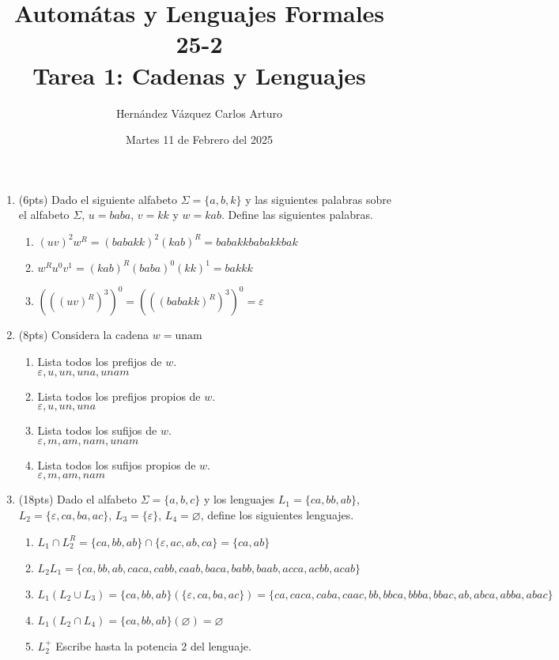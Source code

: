 \documentclass{article}
\title{Autom\'atas y Lenguajes Formales 25-2 \\ Tarea 1: Cadenas y Lenguajes}
\author{Hernández Vázquez Carlos Arturo }
\date{Martes 11 de Febrero del 2025}
\begin{document}
\maketitle

\begin{enumerate}
    \item (6pts) Dado el siguiente alfabeto $\Sigma = \{a, b, k\}$ y las siguientes palabras sobre el alfabeto $\Sigma$, $u = baba$, $v = kk$ y $w = kab$. Define las siguientes palabras.
    \begin{enumerate}
        \item $(uv)^2w^R = (babakk)^2(kab)^R = babakkbabakkbak$
        \item $w^R u^0 v^1 = (kab)^R(baba)^0(kk)^1 = bakkk$ 
        \item $(((uv)^R)^3)^0 = (((babakk)^R)^3)^0 = \varepsilon$ 
    \end{enumerate}
    \item (8pts) Considera la cadena $w = \text{unam}$
    \begin{enumerate}
        \item Lista todos los prefijos de $w$. \\
        $\varepsilon, u, un, una, unam$
        \item Lista todos los prefijos propios de $w$. \\
        $\varepsilon, u, un, una$
        \item Lista todos los sufijos de $w$. \\
        $\varepsilon, m, am, nam, unam$
        \item Lista todos los sufijos propios de $w$. \\
        $\varepsilon, m, am, nam$
    \end{enumerate}
    \item (18pts) Dado el alfabeto $\Sigma = \{a, b, c\}$ y los lenguajes $L_1 = \{ca, bb, ab\}$, $L_2 = \{\varepsilon, ca, ba, ac\}$, $L_3 = \{\varepsilon\}$, $L_4 = \varnothing$, define los siguientes lenguajes.
    \begin{enumerate}
        \item $L_1 \cap L_2^R = \{ca, bb, ab\} \cap \{\varepsilon, ac, ab, ca\} = \{ca, ab\}$
        \item $L_2 L_1 = \{ca, bb, ab, caca, cabb, caab, baca, babb, baab, acca, acbb, acab\} $
        \item $L_1 (L_2 \cup L_3) = \{ca, bb, ab\}(\{\varepsilon, ca, ba, ac\}) = \{ca, caca, caba, caac, bb, bbca, bbba, bbac, ab, abca, abba, abac\}$
        \item $L_1 (L_2 \cap L_4) = \{ca, bb, ab\}(\varnothing) = \varnothing$
        \item $L_2^+$ Escribe hasta la potencia 2 del lenguaje.


\end{enumerate}
\end{enumerate}
\end{document}
